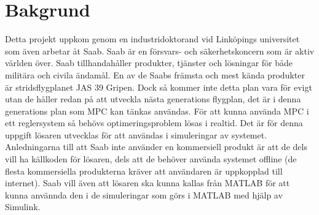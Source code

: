 \section{Bakgrund}    
Detta projekt uppkom genom en industridoktorand vid Linköpings universitet som även arbetar åt Saab. Saab är en försvars- och säkerhetskoncern som är aktiv världen över. Saab tillhandahåller produkter, tjänster och lösningar för både militära och civila ändamål. \citep{SAABbrief}
\newline
\newline
En av de Saabs främsta och mest kända produkter är stridsflygplanet JAS 39 Gripen. Dock så kommer inte detta plan vara för evigt utan de håller redan på att utveckla nästa generations flygplan, det är i denna generations plan som MPC kan tänkas användas. För att kunna använda MPC i ett reglersystem så behövs optimeringsproblem lösas i realtid. Det är för denna uppgift lösaren utvecklas för att användas i simuleringar av systemet. 
\newline
\newline
Anledningarna till att Saab inte använder en kommersiell produkt är att de dels vill ha källkoden för lösaren, dels att de behöver använda systemet offline (de flesta kommersiella produkterna kräver att användaren är uppkopplad till internet).  
\newline
\newline
Saab vill även att lösaren ska kunna kallas från MATLAB för att kunna använnda den i de simuleringar som görs i MATLAB med hjälp av Simulink. 
